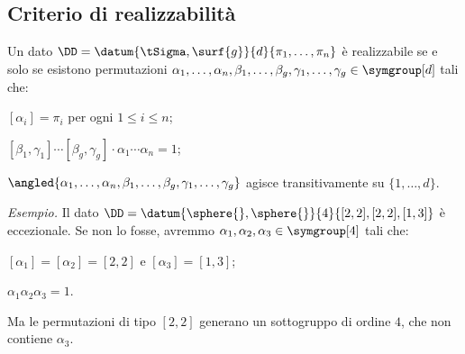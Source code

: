 \subsection{Criterio di realizzabilità}
\begin{frame}
\begin{mybox}[]
Un dato $\DD=\datum{\tSigma,\surf{g}}{d}{\pi_1,\ldots,\pi_n}$ è realizzabile se e solo se esistono permutazioni $\alpha_1,\ldots,\alpha_n,\allowbreak\beta_1,\ldots,\beta_g,\allowbreak\gamma_1,\ldots,\gamma_g\in\symgroup[d]$ tali che:
\begin{enumroman}
\item $[\alpha_i]=\pi_i$ per ogni $1\le i\le n$;
\item $[\beta_1,\gamma_1]\cdots[\beta_g,\gamma_g]\cdot\alpha_1\cdots\alpha_n=1$;
\item $\angled{\alpha_1,\ldots,\alpha_n,\beta_1,\ldots,\beta_g,\gamma_1,\ldots,\gamma_g}$ agisce transitivamente su $\{1,\ldots,d\}$.
\end{enumroman}
\end{mybox}
\vspace{.5em}
\emph{Esempio.} Il dato $\DD=\datum{\sphere{},\sphere{}}{4}{[2,2],[2,2],[1,3]}$ è eccezionale. Se non lo fosse, avremmo $\alpha_1,\alpha_2,\alpha_3\in\symgroup[4]$ tali che:
\begin{enumroman}
\item $[\alpha_1]=[\alpha_2]=[2,2]$ e $[\alpha_3]=[1,3]$;
\item $\alpha_1\alpha_2\alpha_3=1$.
\end{enumroman}
Ma le permutazioni di tipo $[2,2]$ generano un sottogruppo di ordine $4$, che non contiene $\alpha_3$.
\end{frame}